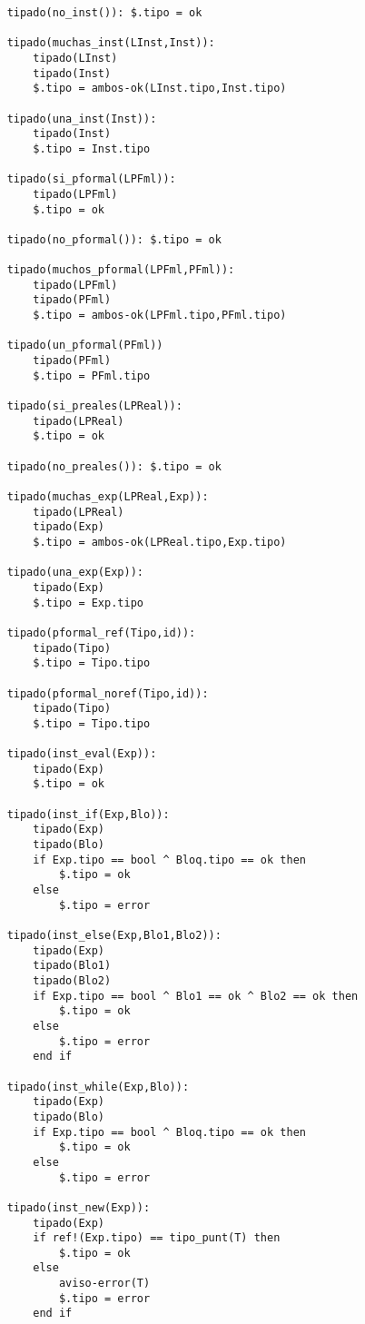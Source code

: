 \begin{lstlisting}
    tipado(no_inst()): $.tipo = ok

    tipado(muchas_inst(LInst,Inst)):
        tipado(LInst)
        tipado(Inst)
        $.tipo = ambos-ok(LInst.tipo,Inst.tipo)

    tipado(una_inst(Inst)):
        tipado(Inst)
        $.tipo = Inst.tipo

    tipado(si_pformal(LPFml)):
        tipado(LPFml)
        $.tipo = ok

    tipado(no_pformal()): $.tipo = ok

    tipado(muchos_pformal(LPFml,PFml)):
        tipado(LPFml)
        tipado(PFml)
        $.tipo = ambos-ok(LPFml.tipo,PFml.tipo)

    tipado(un_pformal(PFml))
        tipado(PFml)
        $.tipo = PFml.tipo

    tipado(si_preales(LPReal)):
        tipado(LPReal)
        $.tipo = ok

    tipado(no_preales()): $.tipo = ok

    tipado(muchas_exp(LPReal,Exp)):
        tipado(LPReal)
        tipado(Exp)
        $.tipo = ambos-ok(LPReal.tipo,Exp.tipo)     

    tipado(una_exp(Exp)):
        tipado(Exp)
        $.tipo = Exp.tipo

    tipado(pformal_ref(Tipo,id)):
        tipado(Tipo)
        $.tipo = Tipo.tipo

    tipado(pformal_noref(Tipo,id)):
        tipado(Tipo)
        $.tipo = Tipo.tipo

    tipado(inst_eval(Exp)):
        tipado(Exp)
        $.tipo = ok

    tipado(inst_if(Exp,Blo)):
        tipado(Exp)
        tipado(Blo)
        if Exp.tipo == bool ^ Bloq.tipo == ok then
            $.tipo = ok
        else
            $.tipo = error

    tipado(inst_else(Exp,Blo1,Blo2)):
        tipado(Exp)
        tipado(Blo1)
        tipado(Blo2)
        if Exp.tipo == bool ^ Blo1 == ok ^ Blo2 == ok then
            $.tipo = ok
        else
            $.tipo = error
        end if

    tipado(inst_while(Exp,Blo)):
        tipado(Exp)
        tipado(Blo)       
        if Exp.tipo == bool ^ Bloq.tipo == ok then
            $.tipo = ok
        else
            $.tipo = error

    tipado(inst_new(Exp)):
        tipado(Exp)
        if ref!(Exp.tipo) == tipo_punt(T) then
            $.tipo = ok
        else
            aviso-error(T)
            $.tipo = error
        end if


\end{lstlisting}
